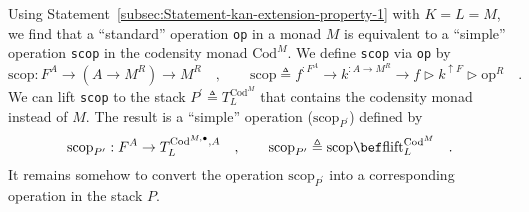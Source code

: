 Using Statement~\ref{subsec:Statement-kan-extension-property-1}
with $K=L=M$, we find that a \textsf{``}standard\textsf{''} operation \lstinline!op!
in a monad $M$ is equivalent to a \textsf{``}simple\textsf{''} operation \lstinline!scop!
in the codensity monad $\text{Cod}^{M}$. We define \lstinline!scop!
via \lstinline!op! by
\begin{equation}
\text{scop}:F^{A}\rightarrow(A\rightarrow M^{R})\rightarrow M^{R}\quad,\quad\quad\text{scop}\triangleq f^{:F^{A}}\rightarrow k^{:A\rightarrow M^{R}}\rightarrow f\triangleright k^{\uparrow F}\triangleright\text{op}^{R}\quad.\label{eq:monatron-scop-via-op}
\end{equation}
We can lift \lstinline!scop! to the stack $P^{\prime}\triangleq T_{L}^{\text{Cod}^{M}}$
that contains the codensity monad instead of $M$. The result is a
\textsf{``}simple\textsf{''} operation ($\text{scop}_{P^{\prime}}$) defined by
\[
\text{scop}_{P^{\prime}}:F^{A}\rightarrow T_{L}^{\text{Cod}^{M,\bullet},A}\quad,\quad\quad\text{scop}_{P^{\prime}}\triangleq\text{scop}\bef\text{flift}_{L}^{\text{Cod}^{M}}\quad.
\]
It remains somehow to convert the operation $\text{scop}_{P^{\prime}}$
into a corresponding operation in the stack $P$.

